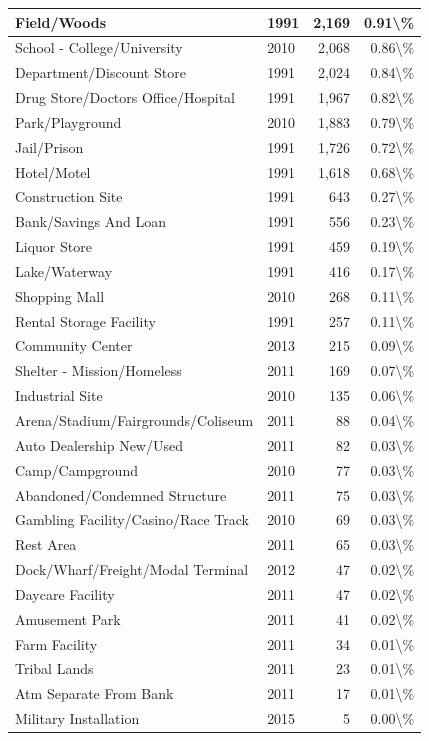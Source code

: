 \documentclass[
]{krantz}
\begin{document}
\begin{longtable}[t]{l|l|r|r}
\hline
Field/Woods & 1991 & 2,169 & 0.91\textbackslash{}\%\\
\hline
School - College/University & 2010 & 2,068 & 0.86\textbackslash{}\%\\
\hline
Department/Discount Store & 1991 & 2,024 & 0.84\textbackslash{}\%\\
\hline
Drug Store/Doctors Office/Hospital & 1991 & 1,967 & 0.82\textbackslash{}\%\\
\hline
Park/Playground & 2010 & 1,883 & 0.79\textbackslash{}\%\\
\hline
Jail/Prison & 1991 & 1,726 & 0.72\textbackslash{}\%\\
\hline
Hotel/Motel & 1991 & 1,618 & 0.68\textbackslash{}\%\\
\hline
Construction Site & 1991 & 643 & 0.27\textbackslash{}\%\\
\hline
Bank/Savings And Loan & 1991 & 556 & 0.23\textbackslash{}\%\\
\hline
Liquor Store & 1991 & 459 & 0.19\textbackslash{}\%\\
\hline
Lake/Waterway & 1991 & 416 & 0.17\textbackslash{}\%\\
\hline
Shopping Mall & 2010 & 268 & 0.11\textbackslash{}\%\\
\hline
Rental Storage Facility & 1991 & 257 & 0.11\textbackslash{}\%\\
\hline
Community Center & 2013 & 215 & 0.09\textbackslash{}\%\\
\hline
Shelter - Mission/Homeless & 2011 & 169 & 0.07\textbackslash{}\%\\
\hline
Industrial Site & 2010 & 135 & 0.06\textbackslash{}\%\\
\hline
Arena/Stadium/Fairgrounds/Coliseum & 2011 & 88 & 0.04\textbackslash{}\%\\
\hline
Auto Dealership New/Used & 2011 & 82 & 0.03\textbackslash{}\%\\
\hline
Camp/Campground & 2010 & 77 & 0.03\textbackslash{}\%\\
\hline
Abandoned/Condemned Structure & 2011 & 75 & 0.03\textbackslash{}\%\\
\hline
Gambling Facility/Casino/Race Track & 2010 & 69 & 0.03\textbackslash{}\%\\
\hline
Rest Area & 2011 & 65 & 0.03\textbackslash{}\%\\
\hline
Dock/Wharf/Freight/Modal Terminal & 2012 & 47 & 0.02\textbackslash{}\%\\
\hline
Daycare Facility & 2011 & 47 & 0.02\textbackslash{}\%\\
\hline
Amusement Park & 2011 & 41 & 0.02\textbackslash{}\%\\
\hline
Farm Facility & 2011 & 34 & 0.01\textbackslash{}\%\\
\hline
Tribal Lands & 2011 & 23 & 0.01\textbackslash{}\%\\
\hline
Atm Separate From Bank & 2011 & 17 & 0.01\textbackslash{}\%\\
\hline
Military Installation & 2015 & 5 & 0.00\textbackslash{}\%\\
\hline
\end{longtable}
\end{document}
